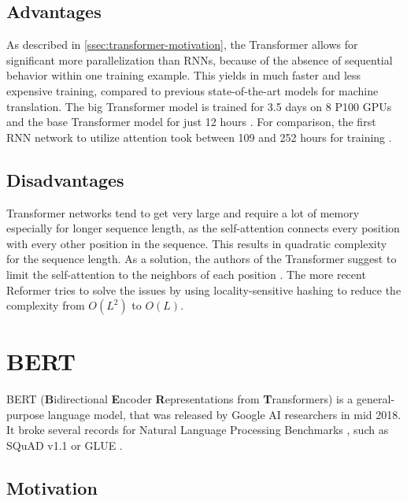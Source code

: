 \subsection{Advantages}

As described in \autoref{ssec:transformer-motivation}, the Transformer allows for significant more parallelization than RNNs, because of the absence of sequential behavior within one training example.
This yields in much faster and less expensive training, compared to previous state-of-the-art models for machine translation.
The big Transformer model is trained for 3.5 days on 8 P100 GPUs and the base Transformer model for just 12 hours \cite[p.~7]{1706.03762}. 
For comparison, the first RNN network to utilize attention took between 109 and 252 hours for training \cite[p.~14]{1409.0473}.

\subsection{Disadvantages}

Transformer networks tend to get very large and require a lot of memory especially for longer sequence length, as the self-attention connects every position with every other position in the sequence.
This results in quadratic complexity for the sequence length.
As a solution, the authors of the Transformer suggest to limit the self-attention to the neighbors of each position \cite[p.~6--7]{1706.03762}.  
The more recent Reformer \cite{kitaev2020reformer} tries to solve the issues by using locality-sensitive hashing to reduce the complexity from $O(L^2)$ to $O(L)$.


\section{BERT}

BERT (\textbf{B}idirectional \textbf{E}ncoder \textbf{R}epresentations from \textbf{T}ransformers) is a general-purpose language model, that was released by Google AI researchers in mid 2018.
It broke several records for Natural Language Processing Benchmarks \cite[p.~5--7]{devlin2018bert}, such as  SQuAD v1.1 \cite{rajpurkar-etal-2016-squad} or GLUE \cite{1804.07461}.

\subsection{Motivation}

